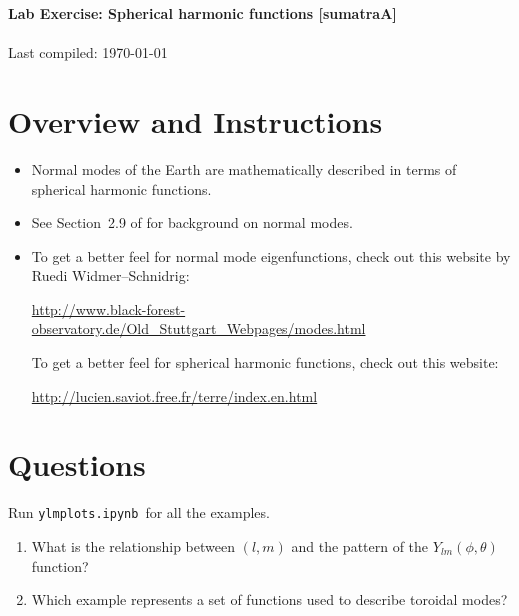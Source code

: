 \documentclass[11pt,titlepage,fleqn]{article}
\newcommand{\tfile}{{\tt ylmplots.ipynb}}
\begin{document}

\begin{spacing}{1.2} 
\centering
{\large \bf Lab Exercise: Spherical harmonic functions [sumatraA]} \\
\cltag\ \\
Last compiled: \today
\end{spacing}

\section{Overview and Instructions}

\begin{itemize}
\item Normal modes of the Earth are mathematically described in terms of spherical harmonic functions.

\item See Section~2.9 of \citet{SteinWysession} for background on normal modes.

\item To get a better feel for normal mode eigenfunctions, check out this website by Ruedi Widmer--Schnidrig:

\url{http://www.black-forest-observatory.de/Old_Stuttgart_Webpages/modes.html}

To get a better feel for spherical harmonic functions, check out this website:

\url{http://lucien.saviot.free.fr/terre/index.en.html}

\end{itemize}


\section{Questions}

Run \tfile\ for all the examples.

\begin{enumerate}
\item What is the relationship between $(l,m)$ and the pattern of the $Y_{lm}(\phi,\theta)$ function?

\vspace{1cm}

\item Which example represents a set of functions used to describe toroidal modes?

\vspace{1cm}

\end{enumerate}



\end{document}

